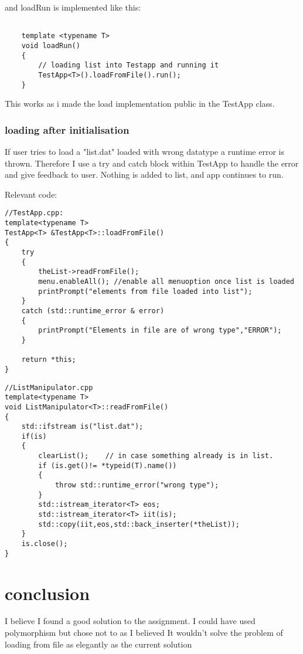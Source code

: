 \documentclass[11pt]{article}
\begin{document}
and loadRun is implemented like this:

\begin{lstlisting}

	template <typename T>
	void loadRun()
	{	
		// loading list into Testapp and running it
		TestApp<T>().loadFromFile().run();  
	}
\end{lstlisting}

This works as i made the load implementation public in the TestApp class.

\subsubsection{loading after initialisation}
If user tries to load a "list.dat" loaded with wrong datatype a runtime error 
is thrown. Therefore I use a try and catch block within TestApp to handle the 
error and give feedback to user. Nothing is added to list, and app continues to run.

Relevant code:
\begin{lstlisting}
//TestApp.cpp:
template<typename T>
TestApp<T> &TestApp<T>::loadFromFile()
{
	try
	{
		theList->readFromFile();
		menu.enableAll(); //enable all menuoption once list is loaded
		printPrompt("elements from file loaded into list");
	}
	catch (std::runtime_error & error)
	{
		printPrompt("Elements in file are of wrong type","ERROR");
	}
	
	return *this;
}
\end{lstlisting}

\begin{lstlisting}
//ListManipulator.cpp
template<typename T>
void ListManipulator<T>::readFromFile()
{
	std::ifstream is("list.dat");
	if(is)
	{
		clearList();	// in case something already is in list.
		if (is.get()!= *typeid(T).name())
		{
			throw std::runtime_error("wrong type");
		}
		std::istream_iterator<T> eos;
		std::istream_iterator<T> iit(is);
		std::copy(iit,eos,std::back_inserter(*theList));
	}
	is.close();
}
\end{lstlisting}



\section{conclusion}
I believe I found a good solution to the assignment. I could have used polymorphism but chose not to as I believed It wouldn't solve the problem of loading from file as elegantly as the current solution
\end{document}
